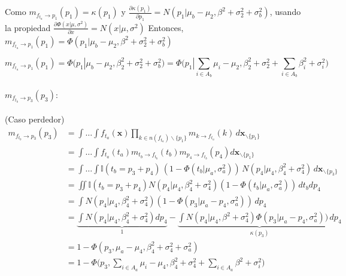 \documentclass[11pt,twoside,spanish]{report} %
\begin{document}
Como $m_{f_{t_a} \rightarrow p_1}(p_1) = \kappa(p_1)$ y $\frac{\partial\kappa(p_1)}{\partial p_1}=  N(p_1| \mu_{b} - \mu_{2}, \beta^2+\sigma_2^2 + \sigma_{b}^2)$, usando la propiedad $\frac{\partial\Phi(x| \mu, \sigma^2)}{\partial x}=N(x| \mu, \sigma^2)$ Entonces, $m_{f_{t_a} \rightarrow p_1}(p_1) = \Phi(p_1| \mu_b - \mu_2, \beta^2 + \sigma_2^2 + \sigma_b^2)$

\begin{equation}
	m_{f_{t_a} \rightarrow p_1}(p_1) =  \Phi(p_1| \mu_b - \mu_2, \beta_2^2 + \sigma_2^2 + \sigma_b^2) =  \Phi\Big(p_1| \sum_{i \in A_b} \mu_i - \mu_2, \beta_2^2 + \sigma_2^2 + \sum_{i \in A_b} \beta_i^2 + \sigma_i^2 \Big)
\end{equation}


\paragraph{$m_{f_{t_b} \rightarrow p_3}(p_3):$} (Caso perdedor)
\begin{equation}
	\begin{split}
		m_{f_{t_b} \rightarrow p_3}(p_3)&= \int \dots \int f_{t_a}(\textbf{x}) \prod_{k \in n(f_{t_a}) \backslash \{p_1\} } m_{k \rightarrow f_{t_a}}(k) \, d\textbf{x}_{\backslash \{p_1\} }  \\
		&= \int \dots \int f_{t_a}(t_a) m_{t_b\rightarrow f_{t_b}}(t_b) m_{p_4 \rightarrow f_{t_b}}(p_4)d\textbf{x}_{\backslash \{p_1\} }  \\
		&= \int \dots \int \mathbb{I}( t_b = p_3 + p_4) \, (1-\Phi (t_b| \mu_a , \sigma_a^2 )) \, N(p_4| \mu_4, \beta_4^2 + \sigma_4^2 ) \, d\textbf{x}_{\backslash \{p_3\} }\\
		&= \iint \mathbb{I}( t_b = p_3 + p_4) N(p_4| \mu_4, \beta_4^2 + \sigma_4^2 )  (1 - \Phi (t_b| \mu_a , \sigma_a^2) )\, dt_b dp_4 \\
		&=\int N(p_4| \mu_4, \beta_4^2 + \sigma_4^2 )  (1 - \Phi (p_3 | \mu_a - p_4 , \sigma_a^2 ) ) \,  dp_4 \\
		& =  \underbrace{\int N(p_4| \mu_4, \beta_4^2 + \sigma_4^2 )dp_4}_{1}  -  \underbrace{\int N(p_4| \mu_4, \beta^2 + \sigma_4^2 ) \Phi (p_3 | \mu_a - p_4 , \sigma_a^2 ) ) \, dp_4}_{\kappa(p_3)} \\
		& = 1 - \Phi(p_3, \mu_a  - \mu_4, \beta_4^2 + \sigma_4^2 + \sigma_a^2)\\[0.1cm]
		&=1 - \Phi\Big(p_3, \sum_{i \in A_a} \mu_i  - \mu_4, \beta_4^2 + \sigma_4^2 + \sum_{i \in A_a} \beta^2 + \sigma_i^2  \Big)
	\end{split}
\end{equation}
\end{document}
